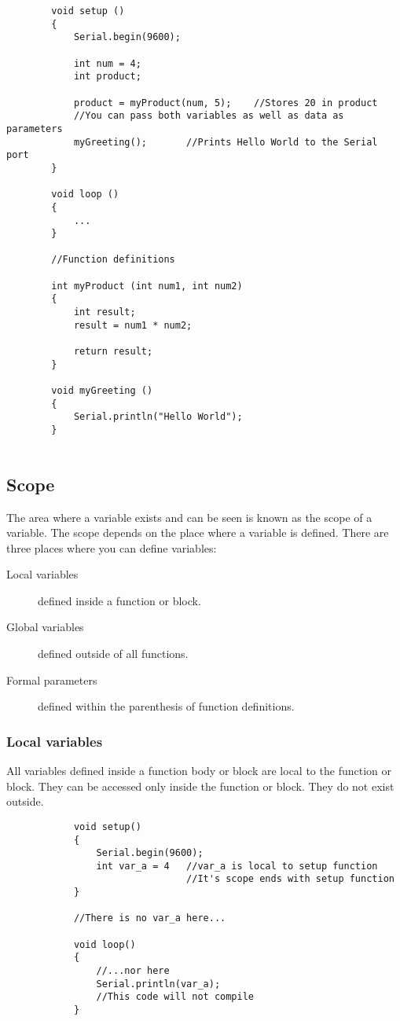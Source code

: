 \documentclass{article}
\begin{document}
		\begin{lstlisting}
		void setup ()
		{
			Serial.begin(9600);

			int num = 4;
			int product;

			product = myProduct(num, 5);	//Stores 20 in product
			//You can pass both variables as well as data as parameters
			myGreeting();		//Prints Hello World to the Serial port
		}

		void loop ()
		{
			...
		}

		//Function definitions

		int myProduct (int num1, int num2)
		{
			int result;
			result = num1 * num2;

			return result;
		}

		void myGreeting ()
		{
			Serial.println("Hello World");
		}
		
		\end{lstlisting}

	\subsection{Scope}

			The area where a variable exists and can be seen is known as the scope of a variable. The scope depends on the place where a variable is defined. There are three places where you can define variables:

			\begin{description}
			\item[Local variables] defined inside a function or block.
			\item[Global variables] defined outside of all functions.
			\item[Formal parameters] defined within the parenthesis of function definitions.
			\end{description}

		\subsubsection{Local variables}

			All variables defined inside a function body or block are local to the function or block. They can be accessed only inside the function or block. They do not exist outside.

			\begin{lstlisting}
			void setup()
			{
				Serial.begin(9600);
				int var_a = 4	//var_a is local to setup function
								//It's scope ends with setup function
			}

			//There is no var_a here...

			void loop()
			{
				//...nor here
				Serial.println(var_a);
				//This code will not compile
			}
			\end{lstlisting}
\end{document}
